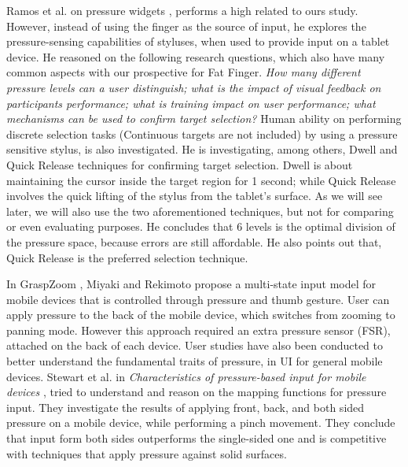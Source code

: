 Ramos et al. on pressure widgets \cite{Ramos2004}, performs a high related to ours study. However, instead of using the finger as the source of input, he explores the pressure-sensing capabilities of styluses, when used to provide input on a tablet device. He reasoned on the following research questions, which also have many common aspects with our prospective for Fat Finger.
\emph{How many different pressure levels can a user distinguish; what is the impact of visual feedback on participants performance; what is training impact on user performance; what mechanisms can be used to confirm target selection?}
Human ability on performing discrete selection tasks (Continuous targets are not included) by using a pressure sensitive stylus,  is also investigated. He is investigating, among others, Dwell and Quick Release techniques for confirming target selection. 
Dwell is about maintaining the cursor inside the target region for 1 second; while Quick Release involves the quick lifting of the stylus from the tablet’s surface.
As we will see later, we will also use the two aforementioned techniques, but not for comparing or even evaluating purposes. He  concludes that 6 levels is the optimal division of the pressure space, because errors are still affordable. He also points out that, Quick Release is the preferred selection technique.


In GraspZoom \cite{Miyaki:2009:GZS:1613858.1613872}, Miyaki and Rekimoto propose a multi-state input model for mobile devices that is controlled through pressure and thumb gesture. User can apply pressure to the back of the mobile device, which switches from zooming to panning mode. However this approach required an extra pressure sensor (FSR), attached on the back of each device.
User studies have also been conducted to better understand the fundamental traits of pressure, in UI for general mobile devices. Stewart et al. in \emph{Characteristics of pressure-based input for mobile devices} \cite{Stewart:2010:CPI:1753326.1753444}, tried to understand and reason on the mapping functions for pressure input. They investigate the results of applying front, back, and both sided pressure on a mobile device, while performing a pinch movement. They conclude that input form both sides  outperforms the single-sided one and is competitive with techniques that apply pressure against solid surfaces. 


